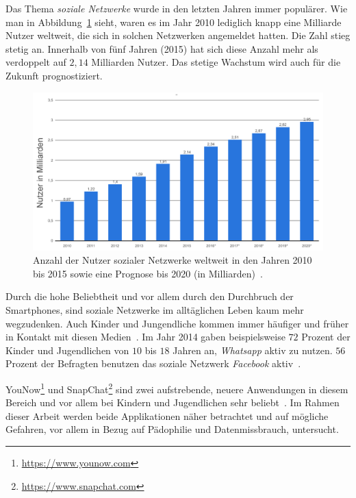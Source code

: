 Das Thema \emph{soziale Netzwerke} wurde in den letzten Jahren immer
popul\"arer. Wie man in Abbildung~\ref{fig:overall} sieht, waren es im Jahr
2010 lediglich knapp eine Milliarde Nutzer weltweit, die sich in solchen
Netzwerken angemeldet hatten. Die Zahl stieg stetig an. Innerhalb von f\"unf
Jahren (2015) hat sich diese Anzahl mehr als verdoppelt auf $2,14$ Milliarden
Nutzer. Das stetige Wachstum wird auch f\"ur die Zukunft prognostiziert.
\begin{figure}[ht]
	\centering
	\includegraphics[scale=0.6]{resources/einf_02.png}
	\caption{Anzahl der Nutzer sozialer Netzwerke weltweit in den Jahren 2010
	bis 2015 sowie eine Prognose bis 2020 (in Milliarden)~\cite{statista-allg}.}
	\label{fig:overall}
\end{figure}

Durch die hohe Beliebtheit und vor allem durch den Durchbruch der Smartphones,
sind soziale Netzwerke im allt\"aglichen Leben kaum mehr wegzudenken. Auch
Kinder und Jungendliche kommen immer h\"aufiger und fr\"uher in Kontakt
mit diesen Medien~\cite{statista-jugendliche}. Im Jahr 2014 gaben
beispielsweise $72$ Prozent der Kinder und Jugendlichen von $10$ bis $18$
Jahren an, \emph{Whatsapp} aktiv zu nutzen. $56$ Prozent der Befragten benutzen
das soziale Netzwerk \emph{Facebook} aktiv~\cite{statista-jugendliche}.


YouNow\footnote{\url{https://www.younow.com}} und
SnapChat\footnote{\url{https://www.snapchat.com}} sind zwei aufstrebende,
neuere Anwendungen in diesem Bereich und vor allem bei Kindern und Jugendlichen
sehr beliebt~\cite{statista-snap,vaterlaus2016snapchat}. Im Rahmen dieser
Arbeit werden beide Applikationen n\"aher betrachtet und auf m\"ogliche
Gefahren, vor allem in Bezug auf P\"adophilie und Datenmissbrauch, untersucht.
